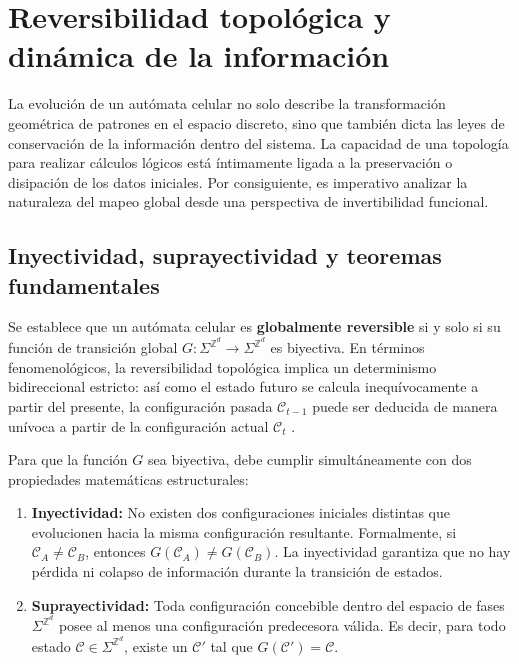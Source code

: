 \section{Reversibilidad topológica y dinámica de la información}
\label{sec:reversibilidad}

La evolución de un autómata celular no solo describe la transformación geométrica de patrones en el espacio discreto, sino que también dicta las leyes de conservación de la información dentro del sistema. La capacidad de una topología para realizar cálculos lógicos está íntimamente ligada a la preservación o disipación de los datos iniciales. Por consiguiente, es imperativo analizar la naturaleza del mapeo global desde una perspectiva de invertibilidad funcional.

\subsection{Inyectividad, suprayectividad y teoremas fundamentales}

Se establece que un autómata celular es \textbf{globalmente reversible} si y solo si su función de transición global $G: \Sigma^{\mathbb{Z}^d} \to \Sigma^{\mathbb{Z}^d}$ es biyectiva. En términos fenomenológicos, la reversibilidad topológica implica un determinismo bidireccional estricto: así como el estado futuro se calcula inequívocamente a partir del presente, la configuración pasada $\mathcal{C}_{t-1}$ puede ser deducida de manera unívoca a partir de la configuración actual $\mathcal{C}_t$ \cite{Toffoli1987}.

Para que la función $G$ sea biyectiva, debe cumplir simultáneamente con dos propiedades matemáticas estructurales:
\begin{enumerate}
    \item \textbf{Inyectividad:} No existen dos configuraciones iniciales distintas que evolucionen hacia la misma configuración resultante. Formalmente, si $\mathcal{C}_A \neq \mathcal{C}_B$, entonces $G(\mathcal{C}_A) \neq G(\mathcal{C}_B)$. La inyectividad garantiza que no hay pérdida ni colapso de información durante la transición de estados.
    \item \textbf{Suprayectividad:} Toda configuración concebible dentro del espacio de fases $\Sigma^{\mathbb{Z}^d}$ posee al menos una configuración predecesora válida. Es decir, para todo estado $\mathcal{C} \in \Sigma^{\mathbb{Z}^d}$, existe un $\mathcal{C}'$ tal que $G(\mathcal{C}') = \mathcal{C}$.
\end{enumerate}


